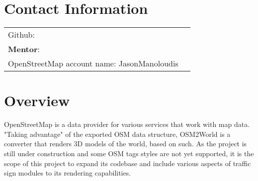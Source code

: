 \documentclass[margin,line]{res}
\begin{document}

\begin{resume}
\section{\sc \textbf{Contact} \textbf{Information}}

\vspace{.05in}
\begin{tabular}{@{}p{3.5in}p{3in}}
{Github:} \color{blue}{\url{https://github.com/JayGhb}}\\
{\textbf{Mentor}:} \href{http://tobias-knerr.de/}{\color{blue}{Tobias Knerr}} \\
{OpenStreetMap account name:} JasonManoloudis
\end{tabular}

\section{\sc \textbf{Overview}}

OpenStreetMap is a data provider for various services that work with map data.
"Taking advantage" of the exported OSM data structure, OSM2World is a converter
that renders 3D models of the world, based on such. As the project is still under construction and some OSM tags styles are not yet supported, it is the scope of this project to expand its codebase and include various aspects of traffic sign  modules to its rendering capabilities.


\end{resume}
\end{document}
